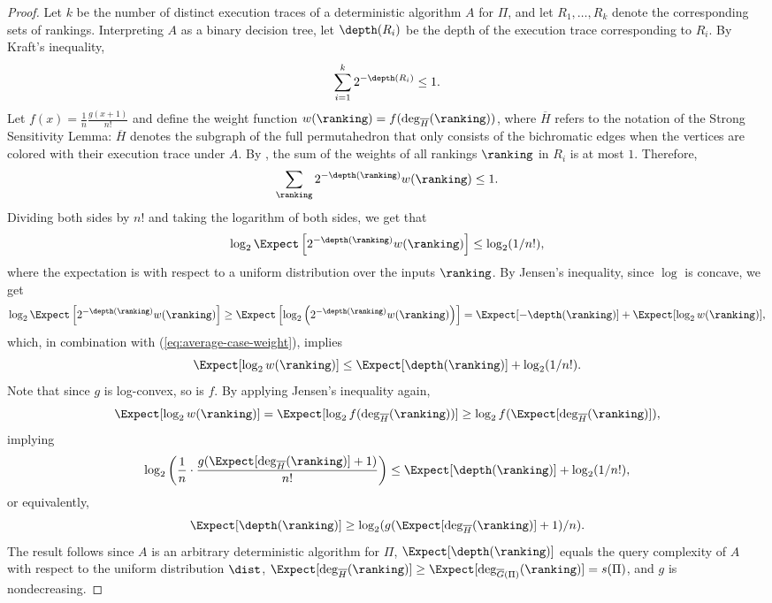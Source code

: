 \begin{proof}
	Let $k$ be the number of distinct execution traces of a deterministic algorithm $A$ for $\Pi$, and let $R_1,\dots,R_k$ denote the corresponding sets of rankings. Interpreting $A$ as a binary decision tree, let $\depth(R_i)$ be the depth of the execution trace corresponding to $R_i$. By Kraft's inequality,
	\[\sum_{i=1}^{k}2^{-\depth(R_i)}\le 1. \]
	Let $f(x)=\frac{1}{n}\frac{g(x+1)}{n!}$ and define the weight function $w(\ranking)=f(\deg_{\overline{H}}(\ranking))$, where $\overline{H}$ refers to the notation of the Strong Sensitivity Lemma: $\overline{H}$ denotes the subgraph of the full permutahedron that only consists of the bichromatic edges when the vertices are colored with their execution trace under $A$. By , the sum of the weights of all  rankings $\ranking$ in $R_i$ is at most $1$. Therefore,
	\[\sum_{\ranking} 2^{-\depth(\ranking)} w(\ranking) \le 1. \]
	Dividing both sides by $n!$ and taking the logarithm of both sides, we get that
	\begin{equation}
		\label{eq:average-case-weight}
		\log_2 \Expect\left[2^{-\depth(\ranking)}w(\ranking)\right] \le \log_2(1/n!),
	\end{equation}
	where the expectation is with respect to a uniform distribution over the inputs $\ranking$.
	By Jensen's inequality, since $\log$ is concave, we get 
	\[\log_2 \Expect\left[2^{-\depth(\ranking)}w(\ranking)\right] \ge \Expect\left[\log_2 \left(2^{-\depth(\ranking)}w(\ranking) \right)\right]= \Expect[-\depth(\ranking)]+\Expect[\log_2 w(\ranking)], \]
	which, in combination with (\ref{eq:average-case-weight}), implies
	\[\Expect[\log_2 w(\ranking)] \le \Expect[\depth(\ranking)]+\log_2(1/n!). \]
	Note that since $g$ is log-convex, so is $f$. By applying Jensen's inequality again,  
	\[\Expect[\log_2 w(\ranking)]=\Expect[\log_2 f(\deg_{\overline{H}}(\ranking))]\ge \log_2 f(\Expect[\deg_{\overline{H}}(\ranking)]),\]
	implying 
	\[ \log_2\left(\frac{1}{n}\cdot \frac{g(\Expect[\deg_{\overline{H}}(\ranking)]+1)}{n!}\right) \le \Expect[\depth(\ranking)]+\log_2(1/n!), \]
	or equivalently,
	\[ \Expect[\depth(\ranking)] \ge \log_2(g(\Expect[\deg_{\overline{H}}(\ranking)]+1)/n). \]
	The result follows since $A$ is an arbitrary deterministic algorithm for $\Pi$, $\Expect[\depth(\ranking)]$ equals the query complexity of $A$ with respect to the uniform distribution $\dist$, $\Expect[\deg_{\overline{H}}(\ranking)] \ge \Expect[\deg_{\overline{G}(\Pi)}(\ranking)] = s(\Pi)$, and $g$ is nondecreasing. 
\end{proof}

